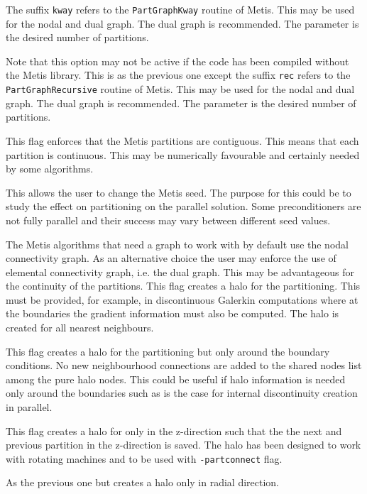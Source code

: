 The suffix \texttt{kway} refers to the \texttt{PartGraphKway} routine of Metis. 
This may be used for the nodal and dual graph. The dual graph is recommended. 
The parameter is the desired number of partitions. 

Note that this option may not be active if the code has been compiled
without the Metis library.
%
This is as the previous one except the suffix \texttt{rec} refers to the \texttt{PartGraphRecursive} routine of Metis. 
This may be used for the nodal and dual graph. The dual graph is recommended. 
The parameter is the desired number of partitions. 

This flag enforces that the Metis partitions are contiguous. This means that
each partition is continuous. This may be numerically favourable and
certainly needed by some algorithms. 

This allows the user to change the Metis seed. The purpose for this could be
to study the effect on partitioning on the parallel solution.
Some preconditioners are not fully parallel and their success may vary between
different seed values. 

The Metis algorithms that need a graph to work with by default use the nodal connectivity graph. As an
alternative choice the user may enforce the use of elemental connectivity graph, i.e. the dual graph. 
This may be advantageous for the continuity of the partitions. 
%
This flag creates a halo for the partitioning. This must be provided, for example, in
discontinuous Galerkin computations where at the boundaries the gradient information 
must also be computed. The halo is created for all nearest neighbours. 

This flag creates a halo for the partitioning but only around the boundary conditions. 
No new neighbourhood connections are added to the shared nodes list among the pure halo nodes. 
This could be useful if halo information is needed only around the boundaries such as is the case 
for internal discontinuity creation in parallel. 

This flag creates a halo for only in the z-direction such that the the next and previous partition in
the z-direction is saved. The halo has been designed to work with rotating machines and to be used with 
\texttt{-partconnect} flag.

As the previous one but creates a halo only in radial direction.

